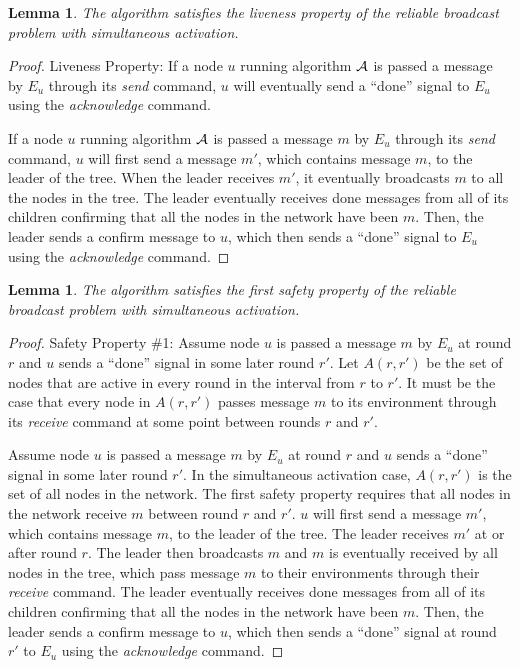\documentclass[english]{article}
\newtheorem{lemma}[theorem]{Lemma}
\begin{document}
\begin{lemma}
\label{StaticRBLiveness}
The algorithm satisfies the liveness property of the reliable broadcast problem with simultaneous activation.
\end{lemma}
\begin{proof}
Liveness Property: If a node $u$ running algorithm $\cal A$ is passed a message by $E_u$ through its \textit{send} command, $u$ will eventually send  a ``done'' signal to $E_u$ using the \textit{acknowledge} command.

If a node $u$ running algorithm $\cal A$ is passed a message $m$ by $E_u$ through its \textit{send} command, $u$ will first send a message $m'$, which contains message $m$, to the leader of the tree. When the leader receives $m'$, it eventually broadcasts $m$ to all the nodes in the tree. The leader eventually receives done messages from all of its children confirming that all the nodes in the network have been $m$. Then, the leader sends a confirm message to $u$, which then sends  a ``done'' signal to $E_u$ using the \textit{acknowledge} command.
\end{proof}


\begin{lemma}
\label{StaticRBSafety1}
The algorithm satisfies the first safety property of the reliable broadcast problem with simultaneous activation.
\end{lemma}
\begin{proof}
Safety Property \#1: Assume node $u$ is passed a message $m$ by $E_u$ at round $r$ and $u$ sends  a ``done'' signal in some later round $r'$. Let $A(r,r')$ be the set of nodes that are active in every round in the interval from $r$ to $r'$. It must be the case that every node in $A(r,r')$ passes message $m$ to its environment through its \textit{receive} command at some point between rounds $r$ and $r'$. 

Assume node $u$ is passed a message $m$ by $E_u$ at round $r$ and $u$ sends  a ``done'' signal in some later round $r'$.
In the simultaneous activation case, $A(r,r')$ is the set of all nodes in the network. The first safety property requires that all nodes in the network receive $m$ between round $r$ and $r'$. $u$ will first send a message $m'$, which contains message $m$, to the leader of the tree. The leader receives $m'$ at or after round $r$. The leader then broadcasts $m$ and $m$ is eventually received by all nodes in the tree, which pass message $m$ to their environments through their \textit{receive} command. The leader eventually receives done messages from all of its children confirming that all the nodes in the network have been $m$. Then, the leader sends a confirm message to $u$, which then sends  a ``done'' signal at round $r'$ to $E_u$ using the \textit{acknowledge} command. 

\end{proof}
\end{document}
